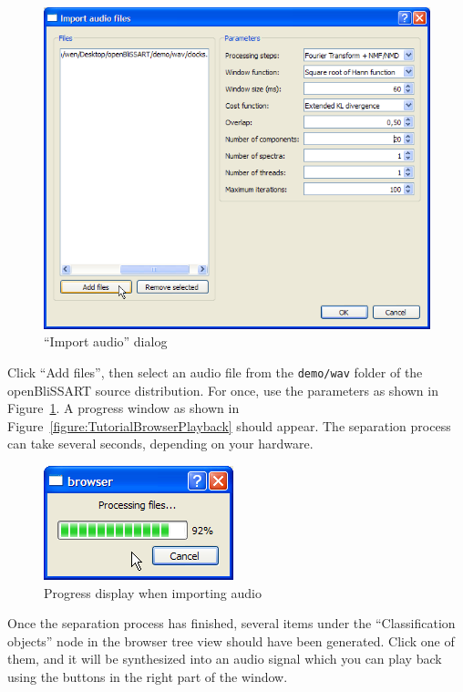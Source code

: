 \begin{figure}
    \centering
    \includegraphics[width=\textwidth]{tutorial-media/ImportAudio1.png}
    \caption{%
        \label{figure:TutorialImportAudio1}%
        ``Import audio'' dialog
    }
\end{figure}

\noindent Click ``Add files'', then select an audio file from the {\tt demo/wav} folder of the openBliSSART source distribution.
For once, use the parameters as shown in
Figure~\ref{figure:TutorialImportAudio1}. A progress window as shown in
Figure~\ref{figure:TutorialBrowserPlayback} should appear. The separation
process can take several seconds, depending on your hardware.

\begin{figure}
    \centering
    \includegraphics[width=.4\textwidth]{tutorial-media/BrowserImportProgress.png}
    \caption{%
        \label{figure:TutorialBrowserImportProgress}%
        Progress display when importing audio
    }
\end{figure}

\noindent Once the separation process has finished, several items under the
``Classification objects'' node in the browser tree view should have been
generated. Click one of them, and it will be synthesized into an audio signal
which you can play back using the buttons in the right part of the window.

